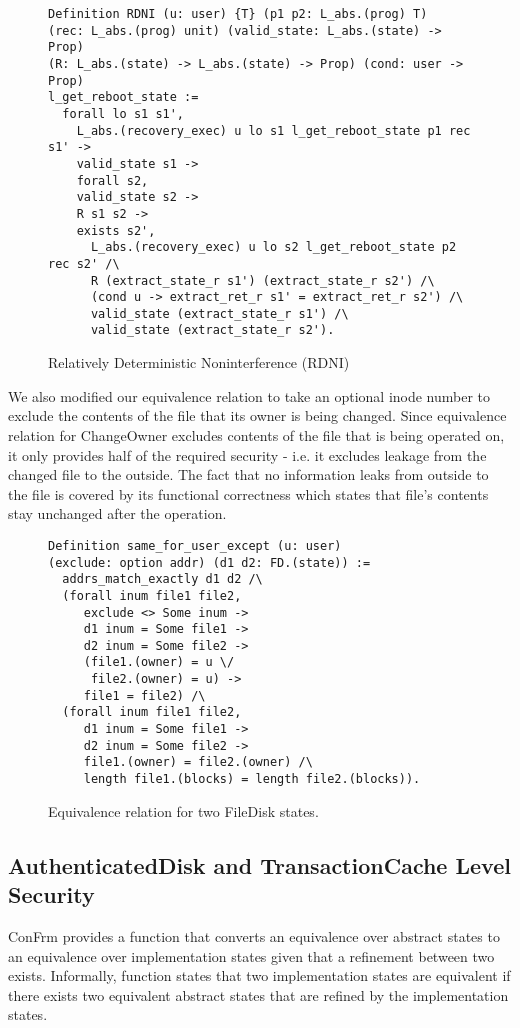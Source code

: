 \begin{figure}[ht]
    \centering
\begin{verbatim}
Definition RDNI (u: user) {T} (p1 p2: L_abs.(prog) T)
(rec: L_abs.(prog) unit) (valid_state: L_abs.(state) -> Prop)
(R: L_abs.(state) -> L_abs.(state) -> Prop) (cond: user -> Prop)
l_get_reboot_state :=
  forall lo s1 s1',
    L_abs.(recovery_exec) u lo s1 l_get_reboot_state p1 rec s1' ->
    valid_state s1 ->
    forall s2,
    valid_state s2 ->
    R s1 s2 ->
    exists s2',
      L_abs.(recovery_exec) u lo s2 l_get_reboot_state p2 rec s2' /\
      R (extract_state_r s1') (extract_state_r s2') /\
      (cond u -> extract_ret_r s1' = extract_ret_r s2') /\
      valid_state (extract_state_r s1') /\
      valid_state (extract_state_r s2').
\end{verbatim}
    \caption{Relatively Deterministic Noninterference (RDNI)}
    \label{fig:RDNI}
\end{figure}

We also modified our equivalence relation to take an optional inode number to exclude the contents of the file that its owner is being changed.
Since equivalence relation for ChangeOwner excludes contents of the file that is being operated on, it only provides half of the required security - i.e. it excludes leakage from the changed file to the outside. The fact that no information leaks from outside to the file is covered by its functional correctness which states that file's contents stay unchanged after the operation.

\begin{figure}[ht]
    \centering
\begin{verbatim}
Definition same_for_user_except (u: user) 
(exclude: option addr) (d1 d2: FD.(state)) :=
  addrs_match_exactly d1 d2 /\
  (forall inum file1 file2,
     exclude <> Some inum ->
     d1 inum = Some file1 ->
     d2 inum = Some file2 ->
     (file1.(owner) = u \/
      file2.(owner) = u) ->
     file1 = file2) /\
  (forall inum file1 file2,
     d1 inum = Some file1 ->
     d2 inum = Some file2 ->
     file1.(owner) = file2.(owner) /\ 
     length file1.(blocks) = length file2.(blocks)).
\end{verbatim}
    \caption{Equivalence relation for two FileDisk states.}
    \label{fig:eqivalence_for_filedisk}
\end{figure}



\subsection{AuthenticatedDisk and TransactionCache Level Security}
ConFrm provides a function that converts an equivalence over abstract states to an equivalence over implementation states given that a refinement between two exists. Informally, function states that two implementation states are equivalent if there exists two equivalent abstract states that are refined by the implementation states.

